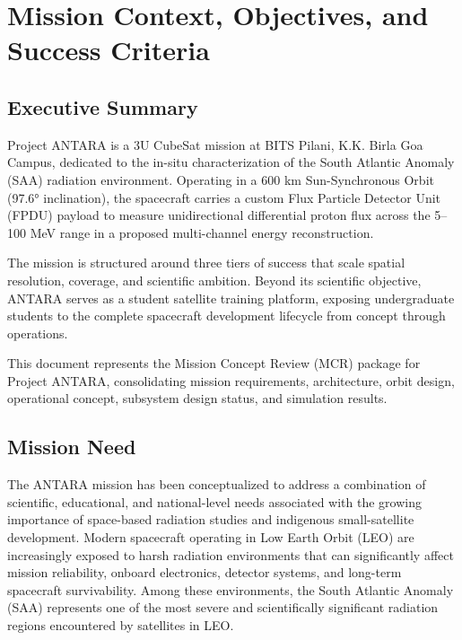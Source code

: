 \section{Mission Context, Objectives, and Success Criteria}\label{executive-summary-document-purpose-and-scope}

\subsection{Executive Summary}\label{executive-summary}

Project ANTARA is a 3U CubeSat mission at BITS Pilani, K.K. Birla Goa
Campus, dedicated to the in-situ characterization of the South Atlantic
Anomaly (SAA) radiation environment. Operating in a 600 km
Sun-Synchronous Orbit (97.6° inclination), the spacecraft carries a
custom Flux Particle Detector Unit (FPDU) payload to measure
unidirectional differential proton flux across the 5--100 MeV range in
a proposed multi-channel energy reconstruction.

The mission is structured around three tiers of success that scale
spatial resolution, coverage, and scientific ambition. Beyond its
scientific objective, ANTARA serves as a student satellite training
platform, exposing undergraduate students to the complete spacecraft
development lifecycle from concept through operations.

This document represents the Mission Concept Review (MCR) package for
Project ANTARA, consolidating mission requirements, architecture, orbit
design, operational concept, subsystem design status, and simulation
results.

\subsection{Mission Need}\label{mission-need}

The ANTARA mission has been conceptualized to address a combination of
scientific, educational, and national-level needs associated with the
growing importance of space-based radiation studies and indigenous
small-satellite development. Modern spacecraft operating in Low Earth
Orbit (LEO) are increasingly exposed to harsh radiation environments
that can significantly affect mission reliability, onboard electronics,
detector systems, and long-term spacecraft survivability. Among these
environments, the South Atlantic Anomaly (SAA) represents one of the
most severe and scientifically significant radiation regions encountered
by satellites in LEO.

